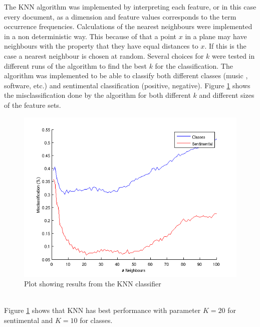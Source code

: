 The KNN algorithm was implemented by interpreting each feature, or in this case
every document, as a dimension and feature values corresponds to the term
occurrence frequencies. Calculations of the nearest neighbours were
implemented in a non deterministic way. This because of that a point $x$ in a plane
may have neighbours with the property that they have equal distances to
$x$. If this is the case a nearest neighbour is chosen at random. Several choices
for $k$ were tested in different runs of the algorithm to find the best $k$ for
the classification. The algorithm was implemented to be able to classify both
different classes (music , software, etc.) and sentimental classification
(positive, negative). Figure \ref{fig:KNNplot} shows the misclassification done by the
algorithm for both different $k$ and different sizes of the feature sets.
\begin{figure}[h!]
\centering
\includegraphics[scale=0.6]{../Plottar/knn_2000words_testdata100_unigram}
\caption{Plot showing results from the KNN classifier}
\label{fig:KNNplot}
\end{figure}\\
Figure \ref{fig:KNNplot} shows that KNN has best performance with parameter $K = 20$ for sentimental and $K = 10$ for classes.


%
